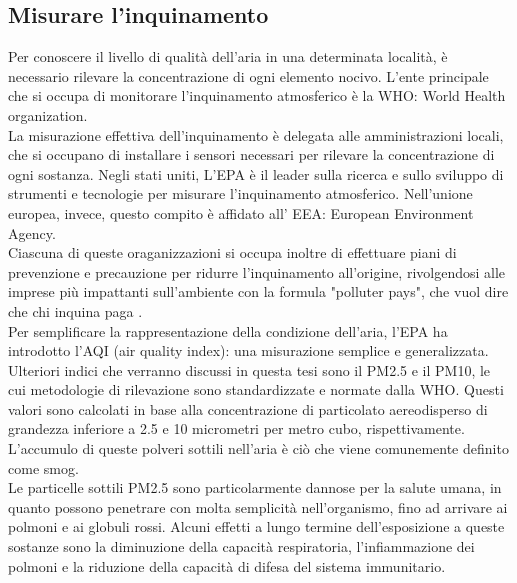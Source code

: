\subsection{Misurare l'inquinamento}
Per conoscere il livello di qualità dell’aria in una determinata località, è necessario rilevare la concentrazione di ogni elemento nocivo. 
L'ente principale che si occupa di monitorare l'inquinamento atmosferico è la WHO: World Health organization.
\\
La misurazione effettiva dell'inquinamento è delegata alle amministrazioni locali, che si occupano di installare i sensori necessari per rilevare la concentrazione di ogni sostanza.
Negli stati uniti, L'EPA è il leader sulla ricerca e sullo sviluppo di strumenti e tecnologie per misurare l'inquinamento atmosferico.
Nell'unione europea, invece, questo compito è affidato all' EEA: European Environment Agency.
\\
Ciascuna di queste oraganizzazioni si occupa inoltre di effettuare piani di prevenzione e precauzione per ridurre l'inquinamento all'origine, rivolgendosi alle imprese più impattanti sull'ambiente con la formula "polluter pays", che vuol dire che chi inquina paga \cite{polluter_pays}.
\\ 
Per semplificare la rappresentazione della condizione dell’aria, l’EPA ha introdotto l’AQI (air quality index): una misurazione semplice e generalizzata.
Ulteriori indici che verranno discussi in questa tesi sono il PM2.5 e il PM10, le cui metodologie di rilevazione sono standardizzate e normate dalla WHO.
Questi valori sono calcolati in base alla concentrazione di particolato aereodisperso di grandezza inferiore a 2.5 e 10 micrometri per metro cubo, rispettivamente.
L'accumulo di queste polveri sottili nell'aria è ciò che viene comunemente definito come smog.
\\
Le particelle sottili PM2.5 sono particolarmente dannose per la salute umana, in quanto possono penetrare con molta semplicità nell'organismo, fino ad arrivare ai polmoni e ai globuli rossi.
Alcuni effetti a lungo termine dell'esposizione a queste sostanze sono la diminuzione della capacità respiratoria, l'infiammazione dei polmoni e la riduzione della capacità di difesa del sistema immunitario.
